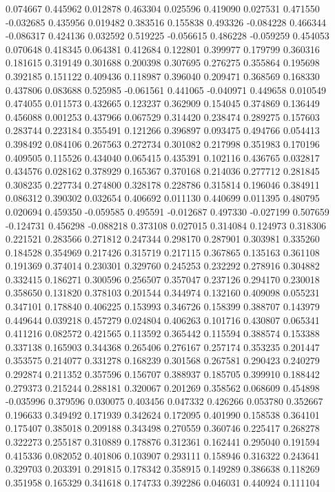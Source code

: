 0.074667
0.445962
0.012878
0.463304
0.025596
0.419090
0.027531
0.471550
-0.032685
0.435956
0.019482
0.383516
0.155838
0.493326
-0.084228
0.466344
-0.086317
0.424136
0.032592
0.519225
-0.056615
0.486228
-0.059259
0.454053
0.070648
0.418345
0.064381
0.412684
0.122801
0.399977
0.179799
0.360316
0.181615
0.319149
0.301688
0.200398
0.307695
0.276275
0.355864
0.195698
0.392185
0.151122
0.409436
0.118987
0.396040
0.209471
0.368569
0.168330
0.437806
0.083688
0.525985
-0.061561
0.441065
-0.040971
0.449658
0.010549
0.474055
0.011573
0.432665
0.123237
0.362909
0.154045
0.374869
0.136449
0.456088
0.001253
0.437966
0.067529
0.314420
0.238474
0.289275
0.157603
0.283744
0.223184
0.355491
0.121266
0.396897
0.093475
0.494766
0.054413
0.398492
0.084106
0.267563
0.272734
0.301082
0.217998
0.351983
0.170196
0.409505
0.115526
0.434040
0.065415
0.435391
0.102116
0.436765
0.032817
0.434576
0.028162
0.378929
0.165367
0.370168
0.214036
0.277712
0.281845
0.308235
0.227734
0.274800
0.328178
0.228786
0.315814
0.196046
0.384911
0.086312
0.390302
0.032654
0.406692
0.011130
0.440699
0.011395
0.480795
0.020694
0.459350
-0.059585
0.495591
-0.012687
0.497330
-0.027199
0.507659
-0.124731
0.456298
-0.088218
0.373108
0.027015
0.314084
0.124973
0.318306
0.221521
0.283566
0.271812
0.247344
0.298170
0.287901
0.303981
0.335260
0.184528
0.354969
0.217426
0.315719
0.217115
0.367865
0.135163
0.361108
0.191369
0.374014
0.230301
0.329760
0.245253
0.232292
0.278916
0.304882
0.332415
0.186271
0.300596
0.256507
0.357047
0.237126
0.294170
0.230018
0.358650
0.131820
0.378103
0.201544
0.344974
0.132160
0.409098
0.055231
0.347101
0.178840
0.406225
0.153993
0.346726
0.158399
0.388707
0.143979
0.449644
0.039218
0.457279
0.024804
0.406263
0.101716
0.430807
0.065341
0.411216
0.082572
0.421565
0.113592
0.365442
0.115594
0.388574
0.153388
0.337138
0.165903
0.344368
0.265406
0.276167
0.257174
0.353235
0.201447
0.353575
0.214077
0.331278
0.168239
0.301568
0.267581
0.290423
0.240279
0.292874
0.211352
0.357596
0.156707
0.388937
0.185705
0.399910
0.188442
0.279373
0.215244
0.288181
0.320067
0.201269
0.358562
0.068609
0.454898
-0.035996
0.379596
0.030075
0.403456
0.047332
0.426266
0.053780
0.352667
0.196633
0.349492
0.171939
0.342624
0.172095
0.401990
0.158538
0.364101
0.175407
0.385018
0.209188
0.343498
0.270559
0.360746
0.225417
0.268278
0.322273
0.255187
0.310889
0.178876
0.312361
0.162441
0.295040
0.191594
0.415336
0.082052
0.401806
0.103907
0.293111
0.158946
0.316322
0.243641
0.329703
0.203391
0.291815
0.178342
0.358915
0.149289
0.386638
0.118269
0.351958
0.165329
0.341618
0.174733
0.392286
0.046031
0.440924
0.111104
